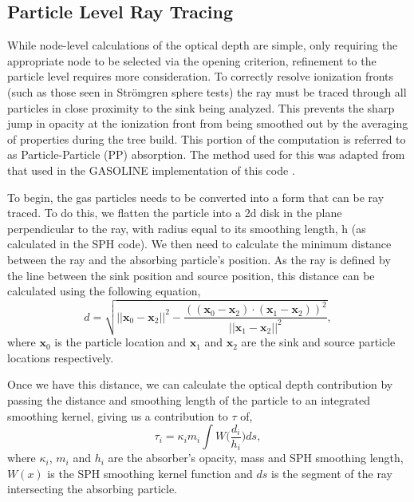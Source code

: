 \subsection{Particle Level Ray Tracing}
\label{sec:ppWalk}
While node-level calculations of the optical depth are simple, only requiring the appropriate node to be selected via the opening criterion, refinement to the particle level requires more consideration. To correctly resolve ionization fronts (such as those seen in Str{\"o}mgren sphere tests) the ray must be traced through all particles in close proximity to the sink being analyzed. This prevents the sharp jump in opacity at the ionization front from being smoothed out by the averaging of properties during the tree build. This portion of the computation is referred to as Particle-Particle (PP) absorption. The method used for this was adapted from that used in the GASOLINE implementation of this code \citep{rory}.

To begin, the gas particles needs to be converted into a form that can be ray traced. To do this, we flatten the particle into a 2d disk in the plane perpendicular to the ray, with radius equal to its smoothing length, h (as calculated in the SPH code). We then need to calculate the minimum distance between the ray and the absorbing particle's position. As the ray is defined by the line between the sink position and source position, this distance can be calculated using the following equation,
\begin{equation}
d = \sqrt{||\bm{x}_0 - \bm{x}_2||^2 - \frac{((\bm{x}_0 - \bm{x}_2) \cdot (\bm{x}_1 - \bm{x}_2))^2} {||\bm{x}_1 - \bm{x}_2||^2}},
\end{equation}
where ${\bm{x}_0}$ is the particle location and ${\bm{x}_1}$ and ${\bm{x}_2}$ are the sink and source particle locations respectively.

Once we have this distance, we can calculate the optical depth contribution by passing the distance and smoothing length of the particle to an integrated smoothing kernel, giving us a contribution to $\tau$ of,
\begin{equation}
\tau_i = \kappa_i m_i \int{W \bigg(\frac{d_i}{h_i}\bigg)}ds,
\end{equation}
where $\kappa_i$, $m_i$ and $h_i$ are the absorber's opacity, mass and SPH smoothing length, $W(x)$ is the SPH smoothing kernel function and $ds$ is the segment of the ray intersecting the absorbing particle.

